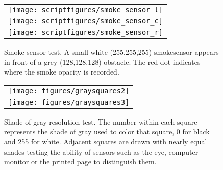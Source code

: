 \begin{figure}[\figoptions]
\begin{center}
 \centering
\begin{tabular}{c}
\texttt{[image: scriptfigures/smoke\_sensor\_l]}\\
\texttt{[image: scriptfigures/smoke\_sensor\_c]}\\
\texttt{[image: scriptfigures/smoke\_sensor\_r]}\\

 \end{tabular}
\end{center}
\caption[Smoke sensor test.]{Smoke sensor test.
A small white (255,255,255) smokesensor appears in front of a grey (128,128,128) obstacle.
The red dot indicates where the smoke opacity is recorded.
}
\label{figsmokesensor}%
\end{figure}

\begin{figure}[\figoptions]
\begin{center}
 \centering
\begin{tabular}{c}
\texttt{[image: figures/graysquares2]}\\
\texttt{[image: figures/graysquares3]}\\
 \end{tabular}
\end{center}
 \caption[Shade of gray resolution test.]{Shade of gray resolution test.
 The number within each square represents the shade of gray used to color that square,
 0 for black and 255 for white.  Adjacent squares are drawn with nearly equal shades
 testing the ability of sensors such as the eye, computer monitor or the printed page
 to distinguish them.
 }
\label{figgraysquare}%
\end{figure}

